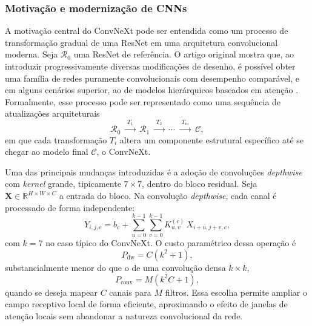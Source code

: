 \documentclass[tcc,capa]{texufpel}
\begin{document}
\subsubsection{Motivação e modernização de CNNs}

A motivação central do ConvNeXt pode ser entendida como um processo de transformação gradual de uma ResNet em uma arquitetura convolucional moderna. Seja \(\mathcal{R}_0\) uma ResNet de referência. O artigo original mostra que, ao introduzir progressivamente diversas modificações de desenho, é possível obter uma família de redes puramente convolucionais com desempenho comparável, e em alguns cenários superior, ao de modelos hierárquicos baseados em atenção \cite{Liu2022ConvNeXt}. Formalmente, esse processo pode ser representado como uma sequência de atualizações arquiteturais
\begin{equation}
	\mathcal{R}_0
	\;\xrightarrow{\;T_1\;}\;
	\mathcal{R}_1
	\;\xrightarrow{\;T_2\;}\;
	\cdots
	\;\xrightarrow{\;T_m\;}\;
	\mathcal{C},
\end{equation}
em que cada transformação \(T_i\) altera um componente estrutural específico até se chegar ao modelo final \(\mathcal{C}\), o ConvNeXt.

Uma das principais mudanças introduzidas é a adoção de convoluções \textit{depthwise} com \textit{kernel} grande, tipicamente \(7\times 7\), dentro do bloco residual. Seja \(\mathbf{X}\in\mathbb{R}^{H\times W\times C}\) a entrada do bloco. Na convolução \textit{depthwise}, cada canal é processado de forma independente:
\begin{equation}
	Y_{i,j,c}
	=
	b_c + \sum_{u=0}^{k-1}\sum_{v=0}^{k-1}
	K^{(c)}_{u,v}\,X_{i+u,j+v,c},
\end{equation}
com \(k=7\) no caso típico do ConvNeXt. O custo paramétrico dessa operação é
\begin{equation}
	P_{\text{dw}} = C(k^2 + 1),
\end{equation}
substancialmente menor do que o de uma convolução densa \(k\times k\),
\begin{equation}
	P_{\text{conv}} = M(k^2 C + 1),
\end{equation}
quando se deseja mapear \(C\) canais para \(M\) filtros. Essa escolha permite ampliar o campo receptivo local de forma eficiente, aproximando o efeito de janelas de atenção locais sem abandonar a natureza convolucional da rede.
\end{document}

